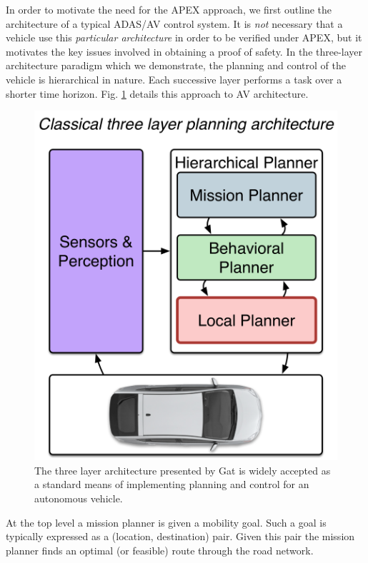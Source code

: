 In order to motivate the need for the APEX approach, we first outline the architecture of a typical ADAS/AV control system. 
It is \emph{not} necessary that a vehicle use this \emph{particular architecture} in order to be verified under APEX, but it motivates the key issues involved in obtaining a proof of safety. In the three-layer architecture paradigm \cite{Gat98} which we demonstrate, the planning and control of the vehicle is hierarchical in nature. Each successive layer performs a task over a shorter time horizon. Fig. \ref{fig:tla_new} details this approach to AV architecture.

\begin{figure}[h]
	\centering
	\includegraphics[scale=.3]{figures/tla_new.png}
	\caption{The three layer architecture presented by Gat is widely accepted as a standard means of implementing planning and control for an autonomous vehicle.}
	\label{fig:tla_new}
\end{figure}

At the top level a mission planner is given a mobility goal. Such a goal is typically expressed as a (location, destination) pair. Given this pair the mission planner finds an optimal (or feasible) route through the road network. 

